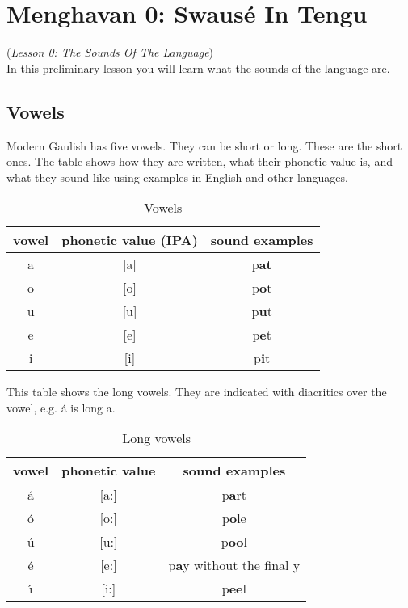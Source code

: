 \section{Menghavan 0: Swaus\'{e} In Tengu}
(\textit{Lesson 0: The Sounds Of The Language})\\

\noindent In this preliminary lesson you will learn what the sounds of the language are.

\subsection{Vowels}
\noindent Modern Gaulish has five vowels. They can be short or long. These are the short ones. The table shows how they are written, what their phonetic value is, and what they sound like using examples in English and other languages.

\begin{table}[H]
\begin{center}
\begin{tabu}{c|c|c}
  \toprule
  vowel & phonetic value (IPA) & sound examples\\
  \toprule
  a & [a] & p\textbf{at}\\
  o & [o] & p\textbf{o}t\\
  u & [u] & p\textbf{u}t\\
  e & [e] & p\textbf{e}t\\
  i & [i] & p\textbf{i}t\\
  \bottomrule
\end{tabu}
\end{center}
\caption{Vowels}
\label{phonology_vowels}
\end{table}

\noindent This table shows the long vowels. They are indicated with diacritics over the vowel, e.g. \'{a} is long a.

\begin{table}[H]
\begin{center}
\begin{tabu}{c|c|c}
  \toprule
  vowel & phonetic value & sound examples\\
  \toprule
  \'{a} & [a:] & p\textbf{a}rt\\
  \'{o} & [o:] & p\textbf{o}le\\
  \'{u} & [u:] & p\textbf{oo}l\\
  \'{e} & [e:] & p\textbf{a}y without the final y\\
  \'{\i} & [i:] & p\textbf{ee}l\\
  \bottomrule
\end{tabu}
\end{center}
\caption{Long vowels}
\label{phonology_long_vowels}
\end{table}

